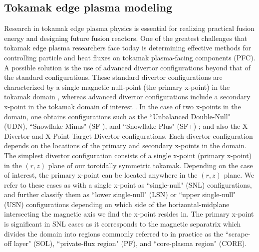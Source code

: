 \subsection{\label{sec:level2}Tokamak edge plasma modeling}
Research in tokamak edge plasma physics is essential for realizing practical fusion energy and designing future fusion reactors. One of the greatest challenges that tokamak edge plasma researchers face today is determining effective methods for controlling particle and heat fluxes on tokamak plasma-facing components (PFC). A possible solution is the use of advanced divertor configurations beyond that of the standard configurations. These standard divertor configurations are characterized by a single magnetic null-point (the primary x-point) in the tokamak domain \cite{krash1}, whereas advanced divertor configurations include a secondary x-point in the tokamak domain of interest \cite{GINGRID_nontrivial_1}. In the case of two x-points in the domain, one obtains configurations such as the ``Unbalanced Double-Null" (UDN), ``Snowflake-Minus" (SF-), and ``Snowflake-Plus" (SF+) \cite{GINGRID_nontrivial_2, Ryutov_2010}; and also the X-Divertor and X-Point Target Divertor configurations. Each divertor configuration depends on the locations of the primary and secondary x-points in the domain. The simplest divertor configuration consists of a single x-point (primary x-point) in the $(r,z)$ plane of our toroidally symmetric tokamak. Depending on the case of interest, the primary x-point can be located anywhere in the $(r,z)$ plane. We refer to these cases as with a single x-point as ``single-null" (SNL) configurations, and further classify them as ``lower single-null" (LSN) or ``upper single-null" (USN) configurations depending on which side of the horizontal-midplane intersecting the magnetic axis we find the x-point resides in. The primary x-point is significant in SNL cases as it corresponds to the magnetic separatrix which divides the domain into regions \cite{LLNL-TR-731515} commonly referred to in practice as the ``scrape-off layer" (SOL), ``private-flux region" (PF), and ``core-plasma region" (CORE).